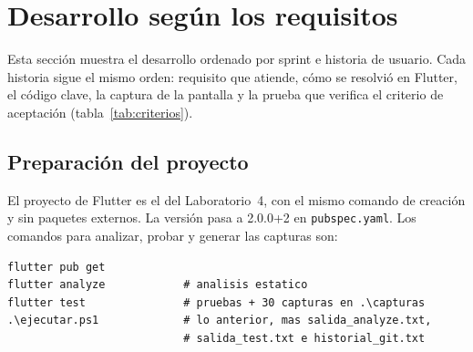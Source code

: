\section{Desarrollo según los requisitos}
\label{sec:desarrollo}

Esta sección muestra el desarrollo ordenado por sprint e historia de usuario. Cada historia sigue el mismo orden: requisito que atiende, cómo se resolvió en Flutter, el código clave, la captura de la pantalla y la prueba que verifica el criterio de aceptación (tabla~\ref{tab:criterios}).

\subsection{Preparación del proyecto}
El proyecto de Flutter es el del Laboratorio~4, con el mismo comando de creación y sin paquetes externos. La versión pasa a 2.0.0+2 en \texttt{pubspec.yaml}. Los comandos para analizar, probar y generar las capturas son:

\begin{lstlisting}[style=consola,caption={Comandos para verificar el proyecto y generar las capturas.},captionpos=b]
flutter pub get
flutter analyze            # analisis estatico
flutter test               # pruebas + 30 capturas en .\capturas
.\ejecutar.ps1             # lo anterior, mas salida_analyze.txt,
                           # salida_test.txt e historial_git.txt
\end{lstlisting}

